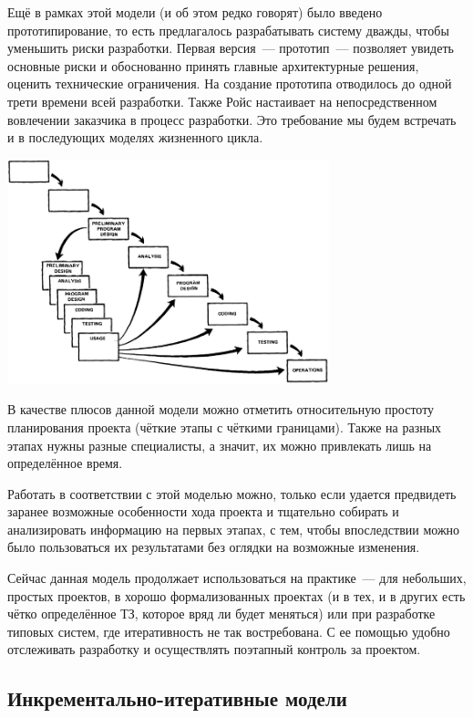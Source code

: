 \documentclass{../../text-style}
\begin{document}
Ещё в рамках этой модели (и об этом редко говорят) было введено прототипирование, то есть предлагалось разрабатывать систему дважды, чтобы уменьшить риски разработки. Первая версия~--- прототип~--- позволяет увидеть основные риски и обоснованно принять главные архитектурные решения, оценить технические ограничения. На создание прототипа отводилось до одной трети времени всей разработки. Также Ройс настаивает на непосредственном вовлечении заказчика в процесс разработки. Это требование мы будем встречать и в последующих моделях жизненного цикла.

\begin{center}
    \includegraphics[width=0.7\textwidth]{waterfallPrototyping.png}
\end{center}

В качестве плюсов данной модели можно отметить относительную простоту планирования проекта (чёткие этапы с чёткими границами). Также на разных этапах нужны разные специалисты, а значит, их можно привлекать лишь на определённое время.

Работать в соответствии с этой моделью можно, только если удается предвидеть заранее возможные особенности хода проекта и тщательно собирать и анализировать информацию на первых этапах, с тем, чтобы впоследствии можно было пользоваться их результатами без оглядки на возможные изменения.

Сейчас данная модель продолжает использоваться на практике~--- для небольших, простых проектов, в хорошо формализованных проектах (и в тех, и в других есть чётко определённое ТЗ, которое вряд ли будет меняться) или при разработке типовых систем, где итеративность не так востребована. С ее помощью удобно отслеживать разработку и осуществлять поэтапный контроль за проектом.

\subsection{Инкрементально-итеративные модели}
\end{document}
